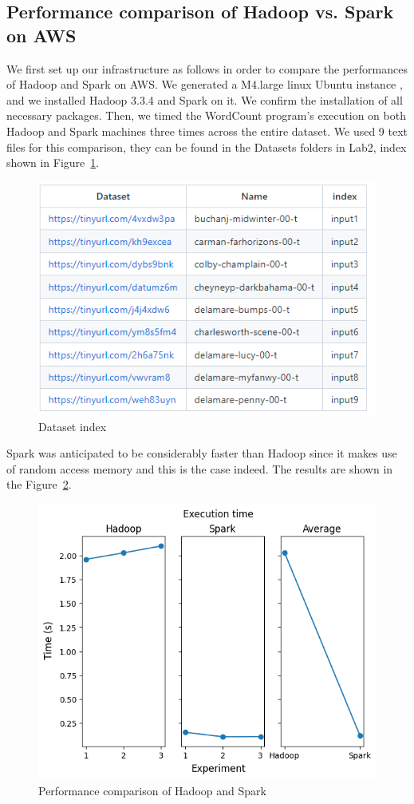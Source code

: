 \documentclass[11pt]{article}
\begin{document}
\subsection{Performance comparison of Hadoop vs. Spark on AWS}
We first set up our infrastructure as follows in order to compare the performances of Hadoop and Spark on AWS. We generated a M4.large linux Ubuntu instance , and we installed Hadoop 3.3.4 and Spark on it. We confirm the installation of all necessary packages. Then, we timed the WordCount program's execution on both Hadoop and Spark machines three times across the entire dataset. We used 9 text files for this comparison, they can be found in the Datasets folders in Lab2, index shown in Figure~\ref{fig:dataset}.
\begin{figure}
    \includegraphics[width=\linewidth]{dataset.png}
    \caption{Dataset index}
    \label{fig:dataset}
\end{figure}

\vspace*{0.5cm}
\noindent
Spark was anticipated to be considerably faster than Hadoop since it makes use of random access memory and this is the case indeed.
The results are shown in the Figure~\ref{fig:plots}.
\begin{figure}
    \includegraphics[width=\linewidth]{execution_time.png}
    \caption{Performance comparison of Hadoop and Spark}
    \label{fig:plots}
\end{figure}
\end{document}

